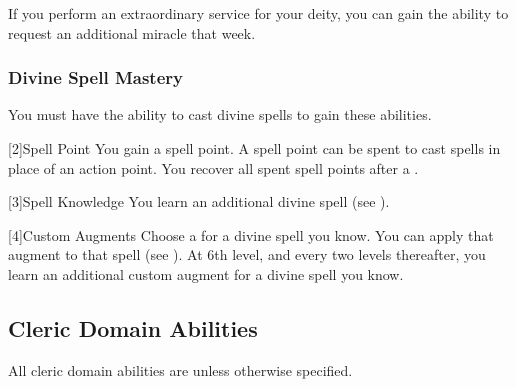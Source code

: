             If you perform an extraordinary service for your deity, you can gain the ability to request an additional miracle that week.

        \subsubsection{Divine Spell Mastery}
            You must have the ability to cast divine spells to gain these abilities.

            [2]{Spell Point}
            You gain a spell point.
            A spell point can be spent to cast spells in place of an action point.
            You recover all spent spell points after a .

            [3]{Spell Knowledge}
            You learn an additional divine spell (see ).

            [4]{Custom Augments}
            Choose a  for a divine spell you know.
            You can apply that augment to that spell (see ).
            At 6th level, and every two levels thereafter, you learn an additional custom augment for a divine spell you know.

    \subsection{Cleric Domain Abilities}
        All cleric domain abilities are  unless otherwise specified.

